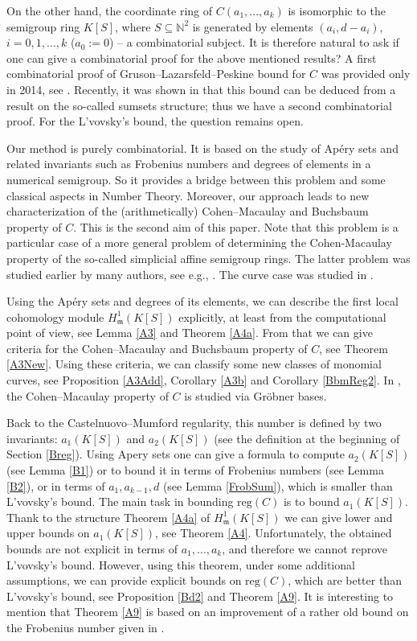\documentclass[11pt]{article}
\def\reg{\mathrm{reg}}
\def\mfr{{\frak m}}
\def\mfr{{\mathfrak m}}
\def\Nset{{\mathbb N}}
\theoremstyle{remark}
\theoremstyle{definition}
\begin{document}
On the other hand, the coordinate ring of $C(a_1,\ldots,a_k)$  is isomorphic  to the semigroup ring $K[S]$, where $S\subseteq \Nset^2$ is generated by elements $(a_i, d- a_i)$, $i=0,1,\ldots,k$ ($a_0 := 0$) -- a combinatorial subject. It is therefore natural to ask if one can give a combinatorial proof for the above mentioned results?  A first combinatorial proof of Gruson--Lazarsfeld--Peskine bound for $C$ was provided only in 2014, see  \cite{Nit}. Recently, it was shown in \cite[Section 5]{GS} that this bound can be deduced from a result \cite[Theorem 2]{GW} on the so-called sumsets structure; thus we have a second combinatorial proof. For the L'vovsky's bound, the question remains open.
 
 Our method is purely combinatorial. It is based on the study of Ap\'ery sets and related invariants such as Frobenius numbers and degrees of elements in a numerical semigroup. So it provides a bridge between this problem and some classical aspects in Number Theory. Moreover, our approach leads to new characterization of the (arithmetically) Cohen--Macaulay and Buchsbaum property of $C$. This is the second aim of this paper. Note that this problem is a particular case of a more general problem of determining the Cohen-Macaulay property of the so-called simplicial affine semigroup rings. The latter problem was studied earlier by many authors, see e.g., \cite{GSW, St, TH}. The curve case was studied in \cite{ Br, T, TH, HeS}. 
 
 Using the Ap\'ery sets and degrees of its elements, we can describe the first local cohomology module $H^1_{\mfr}(K[S])$ explicitly, at least from the computational point of view, see Lemma \ref{A3} and Theorem \ref{A4a}. From that we can give   criteria for the Cohen--Macaulay and Buchsbaum property of $C$, see Theorem \ref{A3New}. Using these criteria, we can classify some new classes of monomial curves, see Proposition \ref{A3Add}, Corollary \ref{A3b} and Corollary \ref{BbmReg2}. In \cite{HeS}, the Cohen--Macaulay property of $C$ is studied via Gr\"obner bases. 
 
 Back to the Castelnuovo--Mumford regularity, this number is defined by two invariants: $a_1(K[S])$ and $a_2(K[S])$ (see the definition at the beginning of Section \ref{Breg}). Using Apery sets one can give a formula to compute $a_2(K[S])$ (see Lemma \ref{B1}) or to bound it in terms of Frobenius numbers (see Lemma \ref{B2}), or in terms of $a_1, a_{k-1}, d$ (see Lemma \ref{FrobSum}), which is smaller than L'vovsky's bound. The main task in bounding $\reg(C)$ is to bound $a_1(K[S])$.  Thank to the structure Theorem \ref{A4a} of $H^1_{\mfr}(K[S])$ we can give  lower and upper bounds on  $a_1(K[S])$, see Theorem \ref{A4}. Unfortunately, the obtained bounds are not explicit in terms of $a_1,\ldots,a_k$, and therefore we cannot reprove L'vovsky's bound. However, using this theorem, under some additional assumptions, we can provide  explicit bounds on $\reg(C)$, which are better than L'vovsky's bound, see Proposition \ref{Bd2} and Theorem \ref{A9}. It is interesting to mention that Theorem \ref{A9} is based on an improvement of a rather old bound on the Frobenius number given in \cite{Se}.
\end{document}
